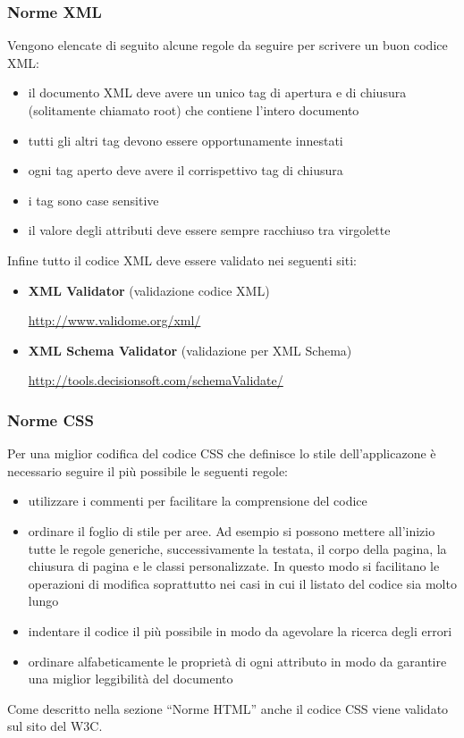 \documentclass[a4paper,11pt]{article}
\begin{document}
\subsubsection{Norme XML}
Vengono elencate di seguito alcune regole da seguire per scrivere un buon codice XML:
\begin{itemize}
\item il documento XML deve avere un unico tag di apertura e di chiusura (solitamente chiamato root) che contiene l'intero documento
\item tutti gli altri tag devono essere opportunamente innestati
\item ogni tag aperto deve avere il corrispettivo tag di chiusura
\item i tag sono case sensitive
\item il valore degli attributi deve essere sempre racchiuso tra virgolette
\end{itemize}
Infine tutto il codice XML deve essere validato nei seguenti siti:
\begin{itemize}
\item \textbf{XML Validator} (validazione codice XML)
\begin{center}
\url{http://www.validome.org/xml/}
\end{center}
\item \textbf{XML Schema Validator} (validazione per XML Schema)
\begin{center}
\url{http://tools.decisionsoft.com/schemaValidate/}
\end{center}
\end{itemize}

\subsubsection{Norme CSS}
Per una miglior codifica del codice CSS che definisce lo stile dell'applicazone \`e necessario seguire il pi\`u possibile le seguenti regole:
\begin{itemize}
\item utilizzare i commenti per facilitare la comprensione del codice
\item ordinare il foglio di stile per aree. Ad esempio si possono mettere all'inizio tutte le regole generiche, successivamente la testata, il corpo della pagina, la chiusura di pagina e le classi personalizzate. In questo modo si facilitano le operazioni di modifica soprattutto nei casi in cui il listato del codice sia molto lungo
\item indentare il codice il pi\`u possibile in modo da agevolare la ricerca degli errori
\item ordinare alfabeticamente le propriet\`a di ogni attributo in modo da garantire una miglior leggibilit\`a del documento
\end{itemize}
Come descritto nella sezione ``Norme HTML'' anche il codice CSS viene validato sul sito del W3C.
\end{document}
